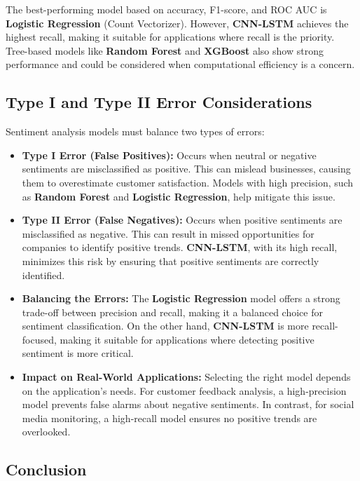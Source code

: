 The best-performing model based on accuracy, F1-score, and ROC AUC is \textbf{Logistic Regression} (Count Vectorizer). However, \textbf{CNN-LSTM} achieves the highest recall, making it suitable for applications where recall is the priority. Tree-based models like \textbf{Random Forest} and \textbf{XGBoost} also show strong performance and could be considered when computational efficiency is a concern.

\subsection{Type I and Type II Error Considerations}

Sentiment analysis models must balance two types of errors:

\begin{itemize}
    \item \textbf{Type I Error (False Positives):} Occurs when neutral or negative sentiments are misclassified as positive. This can mislead businesses, causing them to overestimate customer satisfaction. Models with high precision, such as \textbf{Random Forest} and \textbf{Logistic Regression}, help mitigate this issue.
    
    \item \textbf{Type II Error (False Negatives):} Occurs when positive sentiments are misclassified as negative. This can result in missed opportunities for companies to identify positive trends. \textbf{CNN-LSTM}, with its high recall, minimizes this risk by ensuring that positive sentiments are correctly identified.
    
    \item \textbf{Balancing the Errors:} The \textbf{Logistic Regression} model offers a strong trade-off between precision and recall, making it a balanced choice for sentiment classification. On the other hand, \textbf{CNN-LSTM} is more recall-focused, making it suitable for applications where detecting positive sentiment is more critical.
    
    \item \textbf{Impact on Real-World Applications:} Selecting the right model depends on the application's needs. For customer feedback analysis, a high-precision model prevents false alarms about negative sentiments. In contrast, for social media monitoring, a high-recall model ensures no positive trends are overlooked.
\end{itemize}

\subsection{Conclusion}


